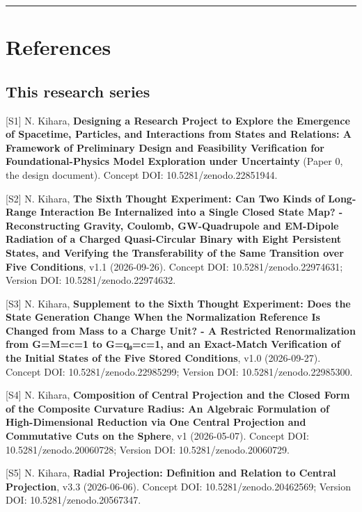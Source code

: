 \documentclass[
  a4paper,
]{article}
\begin{document}
\begin{center}\rule{0.5\linewidth}{0.5pt}\end{center}

\section{References}\label{references}

\subsection{This research series}\label{this-research-series}

{[}S1{]} N. Kihara, \textbf{Designing a Research Project to Explore the
Emergence of Spacetime, Particles, and Interactions from States and
Relations: A Framework of Preliminary Design and Feasibility
Verification for Foundational-Physics Model Exploration under
Uncertainty} (Paper 0, the design document). Concept DOI:
10.5281/zenodo.22851944.

{[}S2{]} N. Kihara, \textbf{The Sixth Thought Experiment: Can Two Kinds
of Long-Range Interaction Be Internalized into a Single Closed State
Map? - Reconstructing Gravity, Coulomb, GW-Quadrupole and EM-Dipole
Radiation of a Charged Quasi-Circular Binary with Eight Persistent
States, and Verifying the Transferability of the Same Transition over
Five Conditions}, v1.1 (2026-09-26). Concept DOI:
10.5281/zenodo.22974631; Version DOI: 10.5281/zenodo.22974632.

{[}S3{]} N. Kihara, \textbf{Supplement to the Sixth Thought Experiment:
Does the State Generation Change When the Normalization Reference Is
Changed from Mass to a Charge Unit? - A Restricted Renormalization from
G=M=c=1 to G=q₀=c=1, and an Exact-Match Verification of the Initial
States of the Five Stored Conditions}, v1.0 (2026-09-27). Concept DOI:
10.5281/zenodo.22985299; Version DOI: 10.5281/zenodo.22985300.

{[}S4{]} N. Kihara, \textbf{Composition of Central Projection and the
Closed Form of the Composite Curvature Radius: An Algebraic Formulation
of High-Dimensional Reduction via One Central Projection and Commutative
Cuts on the Sphere}, v1 (2026-05-07). Concept DOI:
10.5281/zenodo.20060728; Version DOI: 10.5281/zenodo.20060729.

{[}S5{]} N. Kihara, \textbf{Radial Projection: Definition and Relation
to Central Projection}, v3.3 (2026-06-06). Concept DOI:
10.5281/zenodo.20462569; Version DOI: 10.5281/zenodo.20567347.
\end{document}
